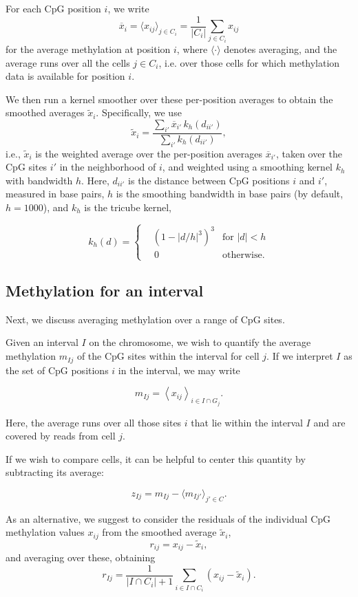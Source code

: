 \documentclass[10pt]{article}
\begin{document}
For each CpG position $i$, we write 
\[\overline{x}_i=\langle x_{ij} \rangle_{j\in C_i} = \frac{1}{|C_i|}\sum_{j\in C_i} x_{ij}\] 
for the average methylation at position $i$, where $\langle\cdot\rangle$ denotes averaging, and the average runs over all the cells $j\in C_i$, i.e.
over those cells for which methylation data is available for position $i$.

We then run a kernel smoother over these per-position averages to obtain the smoothed averages $\tilde x_i$.
Specifically, we use
\[ \tilde x_i = \frac{\sum_{i'} \overline x_{i'}\, k_h(d_{ii'})}{\sum_{i'} k_h(d_{ii'})},\]
i.e., $\tilde x_i$ is the weighted average over the per-position averages $\overline{x}_{i'}$, taken over the CpG sites $i'$ in the neighborhood of $i$, and weighted using a smoothing kernel $k_h$ with bandwidth $h$.
Here, $d_{ii'}$ is the distance between CpG positions $i$ and $i'$, measured in base pairs, $h$ is the smoothing bandwidth in base pairs (by default, $h=1000$), and $k_h$ is the tricube kernel,

\[ k_h(d) = \left\{
\begin{aligned}
    &\left(1-|d/h|^3\right)^3 &\text{for } |d|<h \\
    &\,0 &\text{otherwise}.
\end{aligned}
\right.
\]

\subsection*{Methylation for an interval}

Next, we discuss averaging methylation over a range of CpG sites.

Given an interval $I$ on the chromosome, we wish to quantify the average methylation $m_{Ij}$ of the CpG sites within the interval for cell $j$.
If we interpret $I$ as the set of CpG positions $i$ in the interval, we may write

\[ m_{Ij} = \left< x_{ij} \right>_{i\in I\cap G_j}.\]

Here, the average runs over all those sites $i$ that lie within the interval $I$ and are covered by reads from cell $j$.

If we wish to compare cells, it can be helpful to center this quantity by subtracting its average:

\[ z_{Ij} = m_{Ij} - \langle m_{Ij'}\rangle_{j'\in C}.\]

As an alternative, we suggest to consider the residuals of the individual CpG methylation values $x_{ij}$ from the smoothed average $\tilde x_i$,
\[ r_{ij} = x_{ij} - \tilde x_i, \]
and averaging over these, obtaining
\begin{equation} 
r_{Ij} = \frac{1}{|I\cap C_i|+1}\sum_{i\in I\cap C_i}\left( x_{ij} - \tilde x_i \right).
\label{avgres}
\end{equation}
\end{document}
